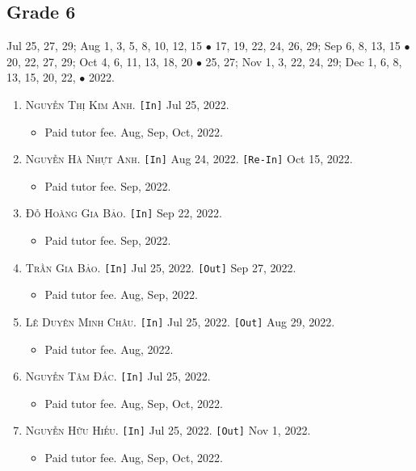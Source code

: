 \documentclass{article}
\numberwithin{equation}{section}
\begin{document}
\subsection{Grade 6}
Jul 25, 27, 29; Aug 1, 3, 5, 8, 10, 12, 15 $\bullet$ 17, 19, 22, 24, 26, 29; Sep 6, 8, 13, 15 $\bullet$ 20, 22, 27, 29; Oct 4, 6, 11, 13, 18, 20 $\bullet$ 25, 27; Nov 1, 3, 22, 24, 29; Dec 1, 6, 8, 13, 15, 20, 22, $\bullet$ 2022.
\begin{enumerate}
	\item \textsc{Nguyễn Thị Kim Anh.} \texttt{[In]} Jul 25, 2022.
	\begin{itemize}
		\item \textsf{Paid tutor fee.} Aug, Sep, Oct, 2022.
	\end{itemize}
	\item \textsc{Nguyễn Hà Nhựt Anh.} \texttt{[In]} Aug 24, 2022. \texttt{[Re-In]} Oct 15, 2022.
	\begin{itemize}
		\item \textsf{Paid tutor fee.} Sep, 2022.
	\end{itemize}
	\item \textsc{Đỗ Hoàng Gia Bảo.} \texttt{[In]} Sep 22, 2022.
	\begin{itemize}
		\item \textsf{Paid tutor fee.} Sep, 2022.
	\end{itemize}
	\item \textsc{Trần Gia Bảo.} \texttt{[In]} Jul 25, 2022. \texttt{[Out]} Sep 27, 2022.
	\begin{itemize}
		\item \textsf{Paid tutor fee.} Aug, Sep, 2022.
	\end{itemize}
	\item \textsc{Lê Duyên Minh Châu.} \texttt{[In]} Jul 25, 2022. \texttt{[Out]} Aug 29, 2022.
	\begin{itemize}
		\item \textsf{Paid tutor fee.} Aug, 2022.
	\end{itemize}
	\item \textsc{Nguyễn Tâm Đắc.} \texttt{[In]} Jul 25, 2022.
	\begin{itemize}
		\item \textsf{Paid tutor fee.} Aug, Sep, Oct, 2022.
	\end{itemize}
	\item \textsc{Nguyễn Hữu Hiếu.} \texttt{[In]} Jul 25, 2022. \texttt{[Out]} Nov 1, 2022.
	\begin{itemize}
		\item \textsf{Paid tutor fee.} Aug, Sep, Oct, 2022.

\end{itemize}
\end{enumerate}
\end{document}
